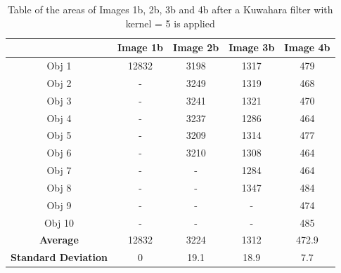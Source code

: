 \documentclass[runningheads]{llncs}
\begin{document}
\begin{table}[h!]
\centering
\begin{tabular}{|c|c|c|c|c|}
\hline
\textbf{} & \textbf{Image 1b} & \textbf{Image 2b} & \textbf{Image 3b} & \textbf{Image 4b} \\
\hline
Obj 1 & 12832      & 3198  & 1317 &  479 \\ \hline
Obj 2 &  -          & 3249  & 1319 & 468\\ \hline
Obj 3 &   -         & 3241 & 1321 &  470\\ \hline
Obj 4 &   -         & 3237  & 1286 &  464\\ \hline
Obj 5 &   -         & 3209 &  1314 &  477\\ \hline
Obj 6 &   -         & 3210 & 1308 &  464\\ \hline
Obj 7 &   -         &  -     & 1284 &  464\\ \hline
Obj 8 &   -         &  -     & 1347 &  484 \\ \hline
Obj 9 &    -        &  -     &  -    & 474\\ \hline
Obj 10 &  -          &  -     &  -    & 485\\ \hline
\textbf{Average} &   12832  &  3224   &   1312   & 472.9  \\ \hline
\textbf{Standard Deviation} &  0      &  19.1    &    18.9 & 7.7 \\ \hline
\end{tabular}
\caption{Table of the areas of Images 1b, 2b, 3b and 4b after a Kuwahara filter with kernel = 5 is applied}
\label{tab:Area-SeriesB-Kuwahara5}
\end{table}
\end{document}
